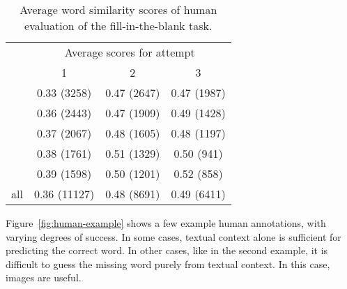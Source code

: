 \documentclass[twocolumn]{svjour3}          \smartqed  \usepackage{graphicx}
\begin{document}
\begin{table}[t]
    \centering
    \caption{Average word similarity scores of human evaluation of the fill-in-the-blank task.}
    \label{tbl:stats_humanevalscore}
\begin{tabular}{cccc}
        \toprule
        & \multicolumn{3}{c}{Average scores for attempt} \\
        \cline{2-4}
        & 1 & 2 & 3 \\
        \midrule
         & 0.33 (3258) & 0.47 (2647) & 0.47 (1987) \\
         & 0.36 (2443) & 0.47 (1909) & 0.49 (1428) \\
         & 0.37 (2067) & 0.48 (1605) & 0.48 (1197) \\
         & 0.38 (1761) & 0.51 (1329) & 0.50 (941) \\
         & 0.39 (1598) & 0.50 (1201) & 0.52 (858) \\
        \midrule
        all & 0.36 (11127) & 0.48 (8691) & 0.49 (6411) \\
        \bottomrule
    \end{tabular}
\end{table}

Figure~\ref{fig:human-example} shows a few example human annotations, with varying degrees of success. In some cases, textual context alone is sufficient for predicting the correct word. In other cases, like in the second example, it is difficult to guess the missing word purely from textual context. In this case, images are useful.
\end{document}
